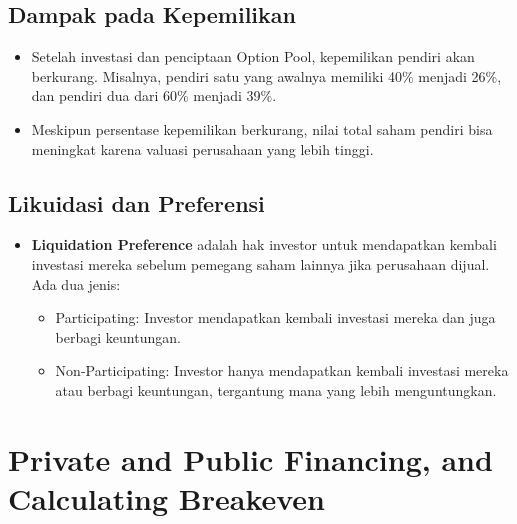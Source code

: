 \documentclass{article}
\begin{document}
\subsection{Dampak pada Kepemilikan}
\begin{itemize}
    \item Setelah investasi dan penciptaan Option Pool, kepemilikan pendiri akan berkurang. Misalnya, pendiri satu yang awalnya memiliki 40\% menjadi 26\%, dan pendiri dua dari 60\% menjadi 39\%.
    \item Meskipun persentase kepemilikan berkurang, nilai total saham pendiri bisa meningkat karena valuasi perusahaan yang lebih tinggi.
\end{itemize}

\subsection{Likuidasi dan Preferensi}
\begin{itemize}
    \item \textbf{Liquidation Preference} adalah hak investor untuk mendapatkan kembali investasi mereka sebelum pemegang saham lainnya jika perusahaan dijual. Ada dua jenis:
          \begin{itemize}
              \item Participating: Investor mendapatkan kembali investasi mereka dan juga berbagi keuntungan.
              \item Non-Participating: Investor hanya mendapatkan kembali investasi mereka atau berbagi keuntungan, tergantung mana yang lebih menguntungkan.
          \end{itemize}
\end{itemize}

\newpage

\section{Private and Public Financing, and Calculating Breakeven}
\end{document}
